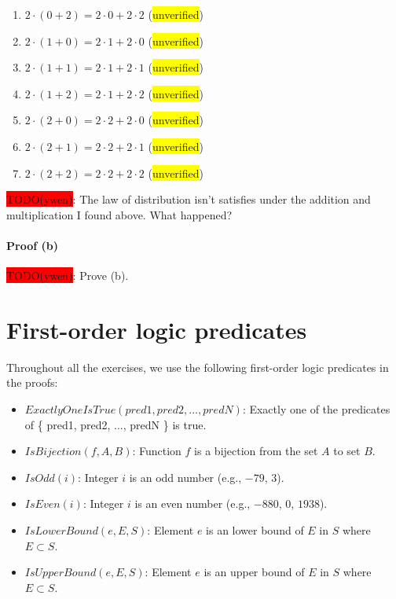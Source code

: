 \documentclass[12pt, letterpaper, oneside]{book}
\begin{document}
\begin{enumerate}
  \item $2 \cdot (0 + 2) = 2 \cdot 0 + 2 \cdot 2$ (\colorbox{yellow}{unverified})
  \item $2 \cdot (1 + 0) = 2 \cdot 1 + 2 \cdot 0$ (\colorbox{yellow}{unverified})
  \item $2 \cdot (1 + 1) = 2 \cdot 1 + 2 \cdot 1$ (\colorbox{yellow}{unverified})
  \item $2 \cdot (1 + 2) = 2 \cdot 1 + 2 \cdot 2$ (\colorbox{yellow}{unverified})
  \item $2 \cdot (2 + 0) = 2 \cdot 2 + 2 \cdot 0$ (\colorbox{yellow}{unverified})
  \item $2 \cdot (2 + 1) = 2 \cdot 2 + 2 \cdot 1$ (\colorbox{yellow}{unverified})
  \item $2 \cdot (2 + 2) = 2 \cdot 2 + 2 \cdot 2$ (\colorbox{yellow}{unverified})
\end{enumerate}

\colorbox{red}{TODO(ywen)}: The law of distribution isn't satisfies under the addition and
multiplication I found above. What happened?

\subsubsection{Proof (b)}

\colorbox{red}{TODO(ywen)}: Prove (b).

%
%

\chapter{First-order logic predicates}

Throughout all the exercises, we use the following first-order logic predicates in the proofs:

\begin{itemize}
  \item $ExactlyOneIsTrue(pred1, pred2, \ldots, predN)$: Exactly one of the predicates of \{ pred1, pred2, $\ldots$,
        predN \} is true.
  \item $IsBijection(f, A, B)$: Function $f$ is a bijection from the set $A$ to set $B$.
  \item $IsOdd(i)$: Integer $i$ is an odd number (e.g., $-79$, $3$).
  \item $IsEven(i)$: Integer $i$ is an even number (e.g., $-880$, $0$, $1938$).
  \item $IsLowerBound(e, E, S)$: Element $e$ is an lower bound of $E$ in $S$ where $E \subset S$.
  \item $IsUpperBound(e, E, S)$: Element $e$ is an upper bound of $E$ in $S$ where $E \subset S$.
\end{itemize}
\end{document}
